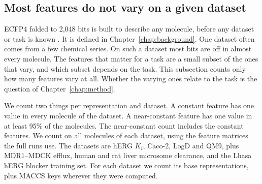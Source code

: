 

\subsection{Most features do not vary on a given dataset}\label{sec:flaws:constant} %
ECFP4 folded to 2,048 bits is built to describe any molecule, before any dataset or task is known \citep{rogers2010}. It is defined in Chapter~\ref{chap:background}. One dataset often comes from a few chemical series. On such a dataset most bits are off in almost every molecule. The features that matter for a task are a small subset of the ones that vary, and which subset depends on the task. This subsection counts only how many features vary at all. Whether the varying ones relate to the task is the question of Chapter~\ref{chap:method}.

We count two things per representation and dataset. A constant feature has one value in every molecule of the dataset. A near-constant feature has one value in at least 95\% of the molecules. The near-constant count includes the constant features. We count on all molecules of each dataset, using the feature matrices the full runs use. The datasets are hERG $K_i$, Caco-2, LogD and QM9, plus MDR1--MDCK efflux, human and rat liver microsome clearance, and the Lhasa hERG blocker training set. For each dataset we count its base representations, plus MACCS keys wherever they were computed.

